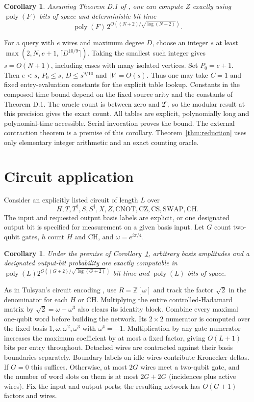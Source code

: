 \documentclass[11pt]{article}
\newtheorem{corollary}[theorem]{Corollary}
\newcommand{\Z}{\mathbb Z}
\newcommand{\poly}{\operatorname{poly}}
\begin{document}
\begin{corollary}\label{cor:weighted}
Assuming Theorem D.1 of \cite{oai}, one can compute $Z$ exactly using $\poly(F)$ bits of space and deterministic bit time
\[
  \poly(F)\,2^{O((N+2)/\sqrt{\log(N+2)})}.
\]
\end{corollary}
For a query with $e$ wires and maximum degree $D$, choose an integer $s$ at least $\max(2,N,e+1,\lceil D^{10/9}\rceil)$. Taking the smallest such integer gives $s=O(N+1)$, including cases with many isolated vertices. Set $P_0=e+1$. Then $e<s$, $P_0\le s$, $D\le s^{9/10}$ and $|V|=O(s)$. Thus one may take $C=1$ and fixed entry-evaluation constants for the explicit table lookup. Constants in the composed time bound depend on the fixed source arity and the constants of Theorem D.1. The oracle count is between zero and $2^e$, so the modular result at this precision gives the exact count. All tables are explicit, polynomially long and polynomial-time accessible. Serial invocation proves the bound. The external contraction theorem is a premise of this corollary. Theorem~\ref{thm:reduction} uses only elementary integer arithmetic and an exact counting oracle.

\section{Circuit application}
Consider an explicitly listed circuit of length $L$ over
\[
 H,T,T^\dagger,S,S^\dagger,X,Z,\mathrm{CNOT},\mathrm{CZ},
 \mathrm{CS},\mathrm{SWAP},\mathrm{CH}.
\]
The input and requested output basis labels are explicit, or one designated output bit is specified for measurement on a given basis input. Let $G$ count two-qubit gates, $h$ count $H$ and $\mathrm{CH}$, and $\omega=e^{i\pi/4}$.
\begin{corollary}\label{cor:circuit}
Under the premise of Corollary~\ref{cor:weighted}, arbitrary basis amplitudes and a designated output-bit probability are exactly computable in $\poly(L)2^{O((G+2)/\sqrt{\log(G+2)})}$ bit time and $\poly(L)$ bits of space.
\end{corollary}
As in Tulsyan's circuit encoding \cite{tulsyan}, use $R=\Z[\omega]$ and track the factor $\sqrt{2}$ in the denominator for each $H$ or $\mathrm{CH}$. Multiplying the entire controlled-Hadamard matrix by $\sqrt{2}=\omega-\omega^3$ also clears its identity block. Combine every maximal one-qubit word before building the network. Its $2\times2$ numerator is computed over the fixed basis $1,\omega,\omega^2,\omega^3$ with $\omega^4=-1$. Multiplication by any gate numerator increases the maximum coefficient by at most a fixed factor, giving $O(L+1)$ bits per entry throughout. Detached wires are contracted against their basis boundaries separately. Boundary labels on idle wires contribute Kronecker deltas. If $G=0$ this suffices. Otherwise, at most $2G$ wires meet a two-qubit gate, and the number of word slots on them is at most $2G+2G$ (incidences plus active wires). Fix the input and output ports; the resulting network has $O(G+1)$ factors and wires.
\end{document}

